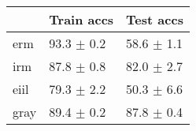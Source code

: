 \begin{tabular}{lll}
\toprule
{} &      Train accs &       Test accs \\
\midrule
erm  &  93.3 $\pm$ 0.2 &  58.6 $\pm$ 1.1 \\
irm  &  87.8 $\pm$ 0.8 &  82.0 $\pm$ 2.7 \\
eiil &  79.3 $\pm$ 2.2 &  50.3 $\pm$ 6.6 \\
gray &  89.4 $\pm$ 0.2 &  87.8 $\pm$ 0.4 \\
\bottomrule
\end{tabular}

